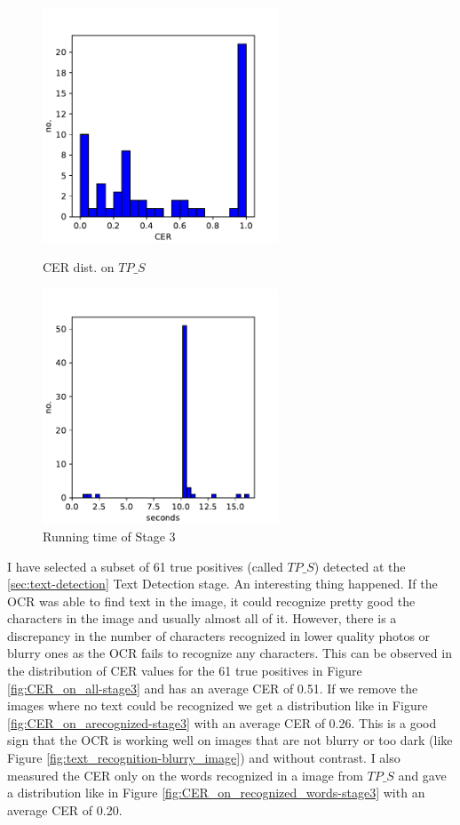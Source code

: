 \begin{figure}
    \centering
    \begin{minipage}[c]{0.5\linewidth}
        \centering
        \includegraphics[height=7cm, keepaspectratio]{img/evaluation/CER_on_all-stage3.pdf}
            \caption{CER dist. on $TP\_S$}
            \label{fig:CER_on_all-stage3}
    \end{minipage}\hfill
    \begin{minipage}[c]{0.5\linewidth}
        \centering
        \includegraphics[height=7cm, keepaspectratio]{img/evaluation/running_time-stage3.pdf}
            \caption{Running time of Stage 3}
            \label{fig:running_time-stage3}
    \end{minipage}\hfill
\end{figure}

I have selected a subset of 61 true positives (called $TP\_S$) detected at the \ref{sec:text-detection} Text Detection stage. An interesting thing happened. If the OCR was able to find text in the image, it could recognize pretty good the characters in the image and usually almost all of it. However, there is a discrepancy in the number of characters recognized in lower quality photos or blurry ones as the OCR fails to recognize any characters. This can be observed in the distribution of CER values for the 61 true positives in Figure \ref{fig:CER_on_all-stage3} and has an average CER of 0.51. If we remove the images where no text could be recognized we get a distribution like in Figure \ref{fig:CER_on_arecognized-stage3} with an average CER of 0.26. This is a good sign that the OCR is working well on images that are not blurry or too dark (like Figure \ref{fig:text_recognition-blurry_image}) and without contrast. I also measured the CER only on the words recognized in a image from $TP\_S$ and gave a distribution like in Figure \ref{fig:CER_on_recognized_words-stage3} with an average CER of 0.20.

